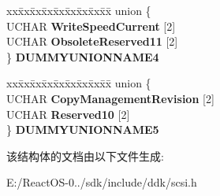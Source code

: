 \begin{DoxyCompactItemize}
\begin{tabbing}
\end{tabbing}\item 
\mbox{\label{struct___c_d_v_d___c_a_p_a_b_i_l_i_t_i_e_s___p_a_g_e_ae525337e9780872b8eff9627bb312d8b}} 
\begin{tabbing}
xx\=xx\=xx\=xx\=xx\=xx\=xx\=xx\=xx\=\kill
union \{\\
\>UCHAR {\bfseries WriteSpeedCurrent} \mbox{[}2\mbox{]}\\
\>UCHAR {\bfseries ObsoleteReserved11} \mbox{[}2\mbox{]}\\
\} {\bfseries DUMMYUNIONNAME4}\\

\end{tabbing}\item 
\mbox{\label{struct___c_d_v_d___c_a_p_a_b_i_l_i_t_i_e_s___p_a_g_e_a33e7404e5504c559752cef88b4b8671b}} 
\begin{tabbing}
xx\=xx\=xx\=xx\=xx\=xx\=xx\=xx\=xx\=\kill
union \{\\
\>UCHAR {\bfseries CopyManagementRevision} \mbox{[}2\mbox{]}\\
\>UCHAR {\bfseries Reserved10} \mbox{[}2\mbox{]}\\
\} {\bfseries DUMMYUNIONNAME5}\\

\end{tabbing}\end{DoxyCompactItemize}


该结构体的文档由以下文件生成\+:\begin{DoxyCompactItemize}
\item 
E\+:/\+React\+O\+S-\/0../sdk/include/ddk/scsi.\+h\end{DoxyCompactItemize}
